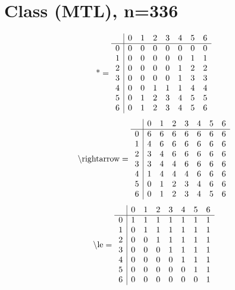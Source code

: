 \documentclass[11pt]{article}
\begin{document}
\section{Class (MTL), n=336}
\[\text{*} = 
\begin{array}{r | r r r r r r r}
 & 0 & 1 & 2 & 3 & 4 & 5 & 6 \\ \hline
0 & 0 & 0 & 0 & 0 & 0 & 0 & 0 \\
1 & 0 & 0 & 0 & 0 & 0 & 1 & 1 \\
2 & 0 & 0 & 0 & 0 & 1 & 2 & 2 \\
3 & 0 & 0 & 0 & 0 & 1 & 3 & 3 \\
4 & 0 & 0 & 1 & 1 & 1 & 4 & 4 \\
5 & 0 & 1 & 2 & 3 & 4 & 5 & 5 \\
6 & 0 & 1 & 2 & 3 & 4 & 5 & 6 \\
\end{array}
\]
\[\text{\textbackslash rightarrow} = 
\begin{array}{r | r r r r r r r}
 & 0 & 1 & 2 & 3 & 4 & 5 & 6 \\ \hline
0 & 6 & 6 & 6 & 6 & 6 & 6 & 6 \\
1 & 4 & 6 & 6 & 6 & 6 & 6 & 6 \\
2 & 3 & 4 & 6 & 6 & 6 & 6 & 6 \\
3 & 3 & 4 & 4 & 6 & 6 & 6 & 6 \\
4 & 1 & 4 & 4 & 4 & 6 & 6 & 6 \\
5 & 0 & 1 & 2 & 3 & 4 & 6 & 6 \\
6 & 0 & 1 & 2 & 3 & 4 & 5 & 6 \\
\end{array}
\]
\[\text{\textbackslash le} = 
\begin{array}{r | r r r r r r r}
 & 0 & 1 & 2 & 3 & 4 & 5 & 6 \\ \hline
0 & 1 & 1 & 1 & 1 & 1 & 1 & 1 \\
1 & 0 & 1 & 1 & 1 & 1 & 1 & 1 \\
2 & 0 & 0 & 1 & 1 & 1 & 1 & 1 \\
3 & 0 & 0 & 0 & 1 & 1 & 1 & 1 \\
4 & 0 & 0 & 0 & 0 & 1 & 1 & 1 \\
5 & 0 & 0 & 0 & 0 & 0 & 1 & 1 \\
6 & 0 & 0 & 0 & 0 & 0 & 0 & 1 \\
\end{array}
\]
\end{document}
